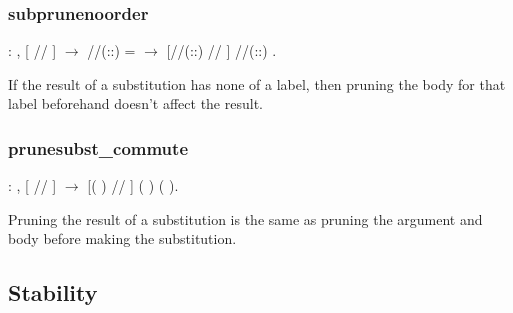 \documentclass[12pt]{report}
\begin{document}
\subsubsection{subprunenoorder}

\begin{coqdoccode}
\coqdocemptyline
\coqdocindent{1.00em}
  : \coqdockw{\ensuremath{\forall}}     ,\coqdoceol
\coqdocindent{2.00em}
[ // ]    \ensuremath{\rightarrow}\coqdoceol
\coqdocindent{2.00em}
//\coqdocvar{\_}(::) =  \ensuremath{\rightarrow}\coqdoceol
\coqdocindent{2.00em}
[//\coqdocvar{\_}(::) // ] //\coqdocvar{\_}(::)  .\coqdoceol
\coqdocemptyline
\end{coqdoccode}
If the result of a substitution has none of a label, then pruning
the body for that label beforehand doesn't affect the result. 

\subsubsection{prunesubst\_commute}

\begin{coqdoccode}
\coqdocemptyline
\coqdocindent{0.50em}
  : \coqdockw{\ensuremath{\forall}}     ,\coqdoceol
\coqdocindent{2.00em}
[ // ]    \ensuremath{\rightarrow}\coqdoceol
\coqdocindent{2.00em}
[(  ) // ] (  )  (  ).\coqdoceol
\coqdocemptyline
\end{coqdoccode}
Pruning the result of a substitution is the same as pruning the
argument and body before making the substitution. 

\subsection{Stability}
\end{document}
